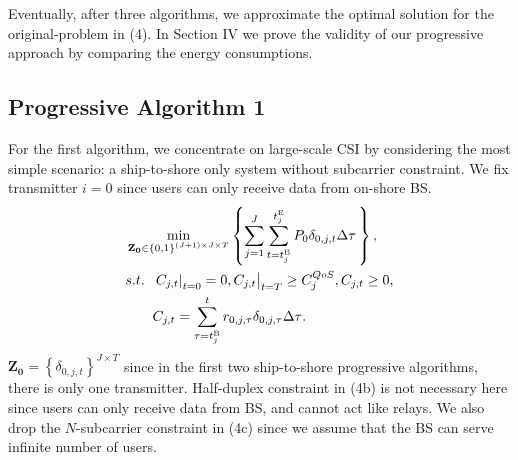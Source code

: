 \documentclass[conference]{IEEEtran}
\begin{document}
Eventually, after three algorithms, we approximate the optimal solution for the original-problem in (4). In Section IV we prove the validity of our progressive approach by comparing the energy consumptions. 

\subsection{Progressive Algorithm 1}

For the first algorithm, we concentrate on large-scale CSI by considering the most simple scenario: a ship-to-shore only system without subcarrier constraint. We fix transmitter $i = 0$ since users can only receive data from on-shore BS. 
\begin{subequations}
\begin{align}
& \mathop {\min }\limits_{{\mathbf{Z}}_{\mathbf{0}} \in {{\left\{ {0,1} \right\}}^{\left( {J + 1} \right) \times J \times T}}} \left\{ {\sum\limits_{j = 1}^J {\sum\limits_{t = t_j^{{\rm{B}}}}^{t_j^{{\rm{E}}}} {{P_{0}}\delta _{0,j,t} \Delta \tau } \,} } \right\} ,\\
& {s.t.} \;\; {\left. {{{\left. {{C_{j,t}}} \right|}_{t = 0}} = 0, {C_{j,t}}} \right|_{t = T}} \ge C_j^{QoS}, {C_{j,t}} \ge 0, \\
& \;\;\;\;\;\;\; {C_{j,t}} = \sum\limits_{\tau  = t_j^{{\rm{B}}}}^t {{r_{0,j,\tau }}\delta _{0,j,\tau}\Delta \tau }.
\end{align}
\end{subequations}
${{\mathbf{Z}}_{\mathbf{0}}}{=}{\left\{ {{\delta _{0,j,t}}} \right\}^{J \times T}}$ since in the first two ship-to-shore progressive algorithms, there is only one transmitter. 
Half-duplex constraint in (4b) is not necessary here since users can only receive data from BS, and cannot act like relays. We also drop the $N$-subcarrier constraint in (4c) since we assume that the BS can serve infinite number of users. 
\end{document}
